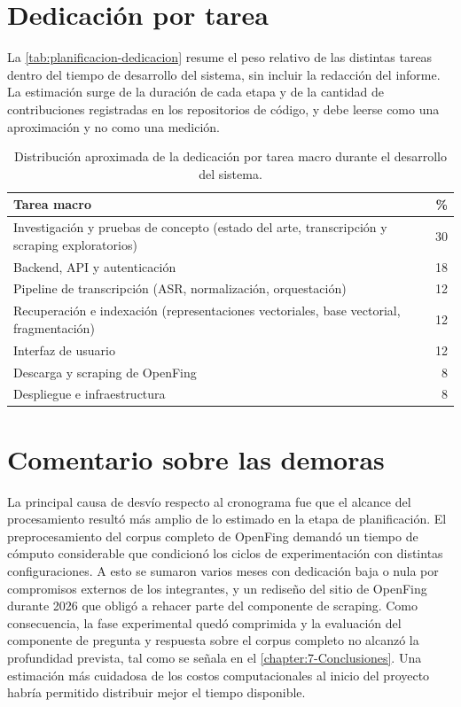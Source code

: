 \section{Dedicación por tarea}

La \autoref{tab:planificacion-dedicacion} resume el peso relativo de las distintas tareas dentro del tiempo de desarrollo del sistema, sin incluir la redacción del informe. La estimación surge de la duración de cada etapa y de la cantidad de contribuciones registradas en los repositorios de código, y debe leerse como una aproximación y no como una medición.

\begin{table}[htbp]
    \centering
    {\small\setlength{\tabcolsep}{4pt}
    \begin{tabular}{@{}p{9.2cm}r@{}}
        \toprule
        \textbf{Tarea macro} & \textbf{\%} \\
        \midrule
        Investigación y pruebas de concepto (estado del arte, transcripción y scraping exploratorios) & 30 \\
        Backend, API y autenticación & 18 \\
        Pipeline de transcripción (ASR, normalización, orquestación) & 12 \\
        Recuperación e indexación (representaciones vectoriales, base vectorial, fragmentación) & 12 \\
        Interfaz de usuario & 12 \\
        Descarga y scraping de OpenFing & 8 \\
        Despliegue e infraestructura & 8 \\
        \bottomrule
    \end{tabular}}
    \caption{Distribución aproximada de la dedicación por tarea macro durante el desarrollo del sistema.}
    \label{tab:planificacion-dedicacion}
\end{table}

\section{Comentario sobre las demoras}

La principal causa de desvío respecto al cronograma fue que el alcance del procesamiento resultó más amplio de lo estimado en la etapa de planificación. El preprocesamiento del corpus completo de OpenFing demandó un tiempo de cómputo considerable que condicionó los ciclos de experimentación con distintas configuraciones. A esto se sumaron varios meses con dedicación baja o nula por compromisos externos de los integrantes, y un rediseño del sitio de OpenFing durante 2026 que obligó a rehacer parte del componente de scraping. Como consecuencia, la fase experimental quedó comprimida y la evaluación del componente de pregunta y respuesta sobre el corpus completo no alcanzó la profundidad prevista, tal como se señala en el \autoref{chapter:7-Conclusiones}. Una estimación más cuidadosa de los costos computacionales al inicio del proyecto habría permitido distribuir mejor el tiempo disponible.
